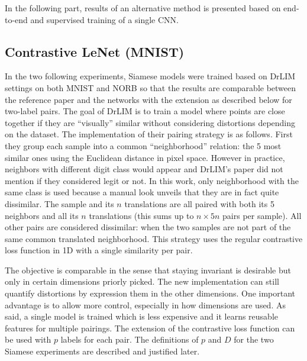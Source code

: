 \documentclass[a4paper,12pt]{report}
\begin{document}
In the following part, results of an alternative method is presented based on end-to-end and supervised training of a single CNN.

\subsection{Contrastive LeNet (MNIST)}
In the two following experiments, Siamese models were trained based on DrLIM settings on both MNIST and NORB so that the results are comparable between the reference paper and the networks with the extension as described below for two-label pairs.
The goal of DrLIM is to train a model where points are close together if they are ``visually'' similar without considering distortions depending on the dataset.
The implementation of their pairing strategy is as follows.
First they group each sample into a common ``neighborhood'' relation: the 5 most similar ones using the Euclidean distance in pixel space.
However in practice, neighbors with different digit class would appear and DrLIM's paper did not mention if they considered legit or not.
In this work, only neighborhood with the same class is used because a manual look unveils that they are in fact quite dissimilar.
The sample and its $n$ translations are all paired with both its 5 neighbors and all its $n$ translations (this sums up to $n \times 5n$ pairs per sample).
All other pairs are considered dissimilar: when the two samples are not part of the same common translated neighborhood.
This strategy uses the regular contrastive loss function in 1D with a single similarity per pair.

The objective is comparable in the sense that staying invariant is desirable but only in certain dimensions priorly picked.
The new implementation can still quantify distortions by expression them in the other dimensions.
One important advantage is to allow more control, especially in how dimensions are used.
As said, a single model is trained which is less expensive and it learns reusable features for multiple pairings.
The extension of the contrastive loss function can be used with $p$ labels for each pair.
The definitions of $p$ and $D$ for the two Siamese experiments are described and justified later.
\end{document}
